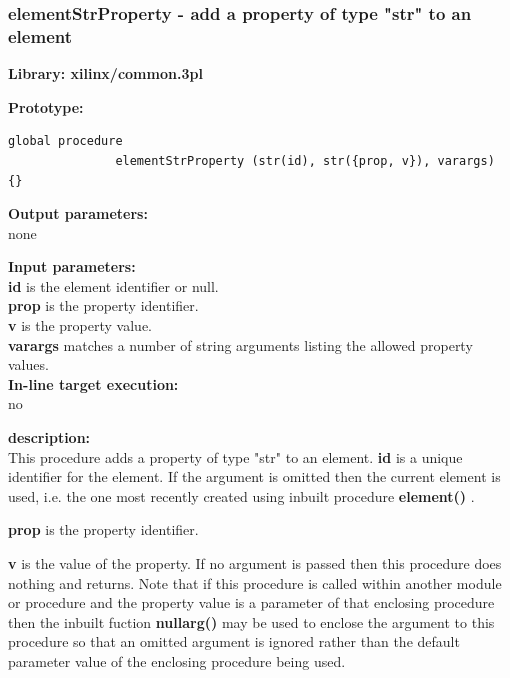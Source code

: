         \subsubsection{elementStrProperty - add a property of type "str" to an element}\label{sec:lpelementStrProperty}
            
            {\bf Library: xilinx/common.3pl}

            {\bf Prototype:} \\
            \vsp
            \begin{lstlisting}[gobble=12, language=threepl]
               global procedure
               elementStrProperty (str(id), str({prop, v}), varargs) {}
            \end{lstlisting}

            {\bf Output parameters:} \\
            none

            {\bf Input parameters:} \\            
            {\bf id} is the element identifier or null.\\
            {\bf prop} is the property identifier.\\
            {\bf v} is the property value.\\
            {\bf varargs} matches a number of string arguments listing the
                allowed property values.\\
        
            {\bf In-line target execution:} \\
            no

            {\bf description:} \\
            This procedure adds a property of type "str" to an element.
            {\bf id} is a unique identifier for the element. If the argument is
            omitted then the current element is used, i.e. the one most recently
            created using inbuilt procedure {\bf element()} .
            
            {\bf prop} is the property identifier.
            
            {\bf v} is the value of the property. If no argument is passed then
            this procedure does nothing and returns. Note that if this procedure
            is called within another module or procedure and the property
            value is a parameter of that enclosing procedure then the inbuilt
            fuction {\bf nullarg()}  may be used to enclose the
            argument to this procedure so that an omitted argument is ignored rather
            than the default parameter value of the enclosing procedure being used.
            
